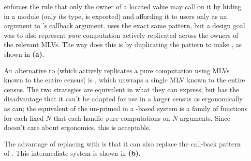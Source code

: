 \HasChor enforces the rule that only the owner of a located value may call  on it
by hiding  in a module (only its type,  is exported)
and affording it to users only as an argument to 's callback argument.
\MultiChor uses the exact same pattern, but a design goal was to also represent \emph{pure} computation
actively replicated across the owners of the relevant MLVs.
The way \MultiChor does this is by duplicating the  pattern
to make ,
as shown in \textbf{(a)}.

An alternative to 
(which actively replicates a pure computation using MLVs known to the entire census)
is ,
which unwraps a single MLV known to the entire census.
The two strategies are equivalent in what they can express,
but  has the disadvantage that it can't be adapted for use in a larger census as ergonomically as  can;
the equivalent of the un-primed  in a -based system is a family of
functions for each fixed $N$ that each handle pure computations on $N$ arguments.
Since \minichor doesn't care about ergonomics, this is acceptable.

The advantage of replacing  with  is that it can also replace the call-back pattern of .
This intermediate system is shown in \textbf{(b)}.

